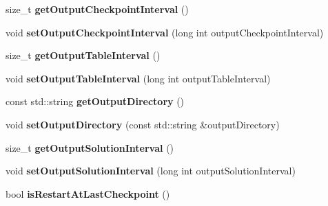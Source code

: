 \begin{DoxyCompactItemize}
\item 
\hypertarget{classnatrium_1_1SolverConfiguration_a7b7ffc9156ba827ab74ff6f1d7bd9151}{size\-\_\-t {\bfseries get\-Output\-Checkpoint\-Interval} ()}\label{classnatrium_1_1SolverConfiguration_a7b7ffc9156ba827ab74ff6f1d7bd9151}

\item 
\hypertarget{classnatrium_1_1SolverConfiguration_ab7a39dfb46cb1b0c7b54b92700fd7360}{void {\bfseries set\-Output\-Checkpoint\-Interval} (long int output\-Checkpoint\-Interval)}\label{classnatrium_1_1SolverConfiguration_ab7a39dfb46cb1b0c7b54b92700fd7360}

\item 
\hypertarget{classnatrium_1_1SolverConfiguration_a6c0fb63902a6828c06c48918402375bb}{size\-\_\-t {\bfseries get\-Output\-Table\-Interval} ()}\label{classnatrium_1_1SolverConfiguration_a6c0fb63902a6828c06c48918402375bb}

\item 
\hypertarget{classnatrium_1_1SolverConfiguration_a207c38e009015be45e74eaa86f9db7ad}{void {\bfseries set\-Output\-Table\-Interval} (long int output\-Table\-Interval)}\label{classnatrium_1_1SolverConfiguration_a207c38e009015be45e74eaa86f9db7ad}

\item 
\hypertarget{classnatrium_1_1SolverConfiguration_a2a0444878a5fb512772e024bc03ec076}{const std\-::string {\bfseries get\-Output\-Directory} ()}\label{classnatrium_1_1SolverConfiguration_a2a0444878a5fb512772e024bc03ec076}

\item 
\hypertarget{classnatrium_1_1SolverConfiguration_acd249488bb83773514c4d6917b5bfc3a}{void {\bfseries set\-Output\-Directory} (const std\-::string \&output\-Directory)}\label{classnatrium_1_1SolverConfiguration_acd249488bb83773514c4d6917b5bfc3a}

\item 
\hypertarget{classnatrium_1_1SolverConfiguration_aa7fdb1358469be8faf1cc14c64538927}{size\-\_\-t {\bfseries get\-Output\-Solution\-Interval} ()}\label{classnatrium_1_1SolverConfiguration_aa7fdb1358469be8faf1cc14c64538927}

\item 
\hypertarget{classnatrium_1_1SolverConfiguration_ab49c72f19d58f7408eb14ac7fd865b78}{void {\bfseries set\-Output\-Solution\-Interval} (long int output\-Solution\-Interval)}\label{classnatrium_1_1SolverConfiguration_ab49c72f19d58f7408eb14ac7fd865b78}

\item 
\hypertarget{classnatrium_1_1SolverConfiguration_a6ca256e404b94f7201ecace9307ef1df}{bool {\bfseries is\-Restart\-At\-Last\-Checkpoint} ()}\label{classnatrium_1_1SolverConfiguration_a6ca256e404b94f7201ecace9307ef1df}


\end{DoxyCompactItemize}
